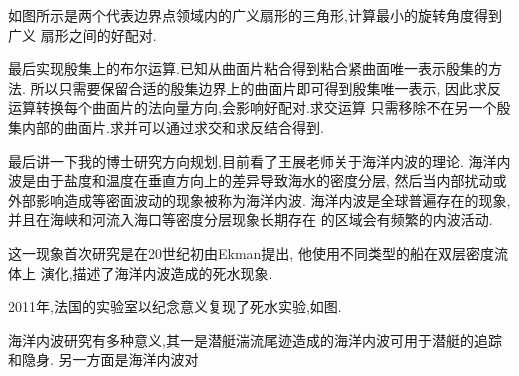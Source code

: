 \documentclass[UTF8]{ctexbeamer}	%
\theoremstyle{plain}
\theoremstyle{definition}
\theoremstyle{remark}
\numberwithin{equation}{section}
\begin{document}
\begin{frame}
    如图所示是两个代表边界点领域内的广义扇形的三角形,计算最小的旋转角度得到广义
    扇形之间的好配对.
\end{frame}

\begin{frame}
    最后实现殷集上的布尔运算.已知从曲面片粘合得到粘合紧曲面唯一表示殷集的方法.
    所以只需要保留合适的殷集边界上的曲面片即可得到殷集唯一表示,
    因此求反运算转换每个曲面片的法向量方向,会影响好配对.求交运算
    只需移除不在另一个殷集内部的曲面片.求并可以通过求交和求反结合得到.
\end{frame}

\begin{frame}
    最后讲一下我的博士研究方向规划,目前看了王展老师关于海洋内波的理论.
    海洋内波是由于盐度和温度在垂直方向上的差异导致海水的密度分层,
    然后当内部扰动或外部影响造成等密面波动的现象被称为海洋内波.
    海洋内波是全球普遍存在的现象,并且在海峡和河流入海口等密度分层现象长期存在
    的区域会有频繁的内波活动.

    这一现象首次研究是在20世纪初由Ekman提出, 他使用不同类型的船在双层密度流体上
    演化,描述了海洋内波造成的死水现象.
\end{frame}

\begin{frame}
    2011年,法国的实验室以纪念意义复现了死水实验,如图.
\end{frame}

\begin{frame}
    海洋内波研究有多种意义,其一是潜艇湍流尾迹造成的海洋内波可用于潜艇的追踪和隐身.
    另一方面是海洋内波对
\end{frame}



\end{document}
